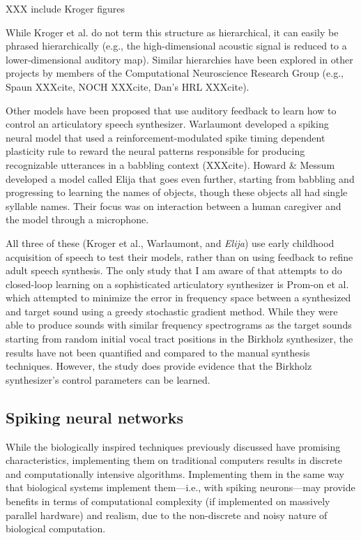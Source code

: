 \documentclass{article}
\begin{document}
XXX include Kroger figures

While Kroger et al.
do not term this structure
as hierarchical,
it can easily be phrased hierarchically
(e.g., the high-dimensional acoustic
signal is reduced to a lower-dimensional
auditory map).
Similar hierarchies have been explored
in other projects by members of the
Computational Neuroscience Research Group
(e.g., Spaun XXXcite, NOCH XXXcite, Dan's HRL XXXcite).

Other models have been proposed
that use auditory feedback
to learn how to control
an articulatory speech synthesizer.
Warlaumont developed a spiking neural model
that used a reinforcement-modulated
spike timing dependent plasticity rule
to reward the neural patterns
responsible for producing
recognizable utterances
in a babbling context
(XXXcite).
Howard \& Messum developed
a model called Elija
that goes even further,
starting from babbling
and progressing to learning
the names of objects,
though these objects all had
single syllable names.
Their focus was on interaction
between a human caregiver
and the model through a microphone.

All three of these
(Kroger et al., Warlaumont, and \textit{Elija})
use early childhood acquisition of speech
to test their models,
rather than on using feedback
to refine adult speech synthesis.
The only study that I am aware of
that attempts to do closed-loop learning
on a sophisticated articulatory synthesizer
is Prom-on et al. which attempted
to minimize the error in frequency space
between a synthesized and target sound
using a greedy stochastic gradient method.
While they were able to produce
sounds with similar frequency spectrograms
as the target sounds starting from
random initial vocal tract positions
in the Birkholz synthesizer,
the results have not been quantified
and compared to the manual
synthesis techniques.
However, the study does provide
evidence that the Birkholz synthesizer's
control parameters can be learned.

\subsection{Spiking neural networks}

While the biologically inspired techniques
previously discussed have
promising characteristics,
implementing them on traditional computers
results in discrete and
computationally intensive algorithms.
Implementing them in the same way
that biological systems implement
them---i.e., with spiking neurons---may
provide benefits in terms of
computational complexity
(if implemented on massively parallel hardware)
and realism, due to the non-discrete
and noisy nature of biological computation.
\end{document}
